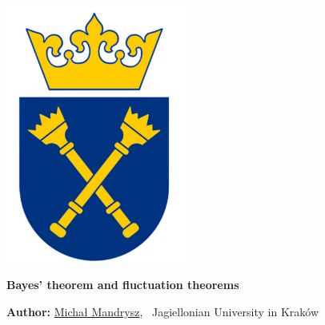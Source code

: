 \documentclass[a0]{sciposter}
\institute 
{Jagiellonian University in Kraków}
\begin{document}






\vspace{-0.5cm}
\center
\includegraphics[width=6.0cm]{ujlogo.pdf}	

\vspace{0.5cm}

\color{DarkBlue}
\center
\textbf{\Huge{Bayes' theorem and fluctuation theorems}
}

\color{black}
\vspace{0.9cm}

\textbf{\Large{Author:}} \Large{\underline{Micha\l{} Mandrysz}, \ Jagiellonian University in Krak\'{o}w}
\vspace{0.6cm}

\end{document}
